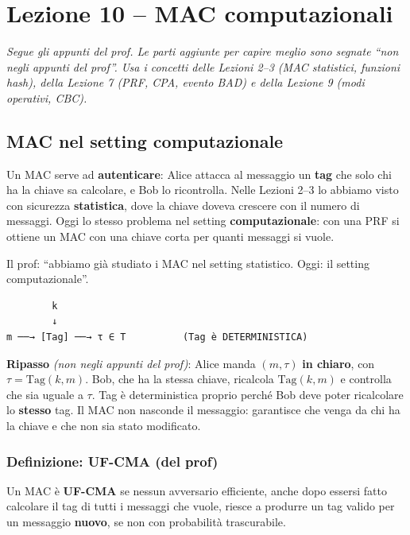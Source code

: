 \chapter{Lezione 10 -- MAC computazionali}

\emph{Segue gli appunti del prof. Le parti aggiunte per capire meglio sono segnate ``non negli appunti del prof''. Usa i concetti delle Lezioni 2--3 (MAC statistici, funzioni hash), della Lezione 7 (PRF, CPA, evento BAD) e della Lezione 9 (modi operativi, CBC).}

\section{MAC nel setting computazionale}

\begin{inbreve}
Un MAC serve ad \textbf{autenticare}: Alice attacca al messaggio un \textbf{tag} che solo chi ha la chiave sa calcolare, e Bob lo ricontrolla. Nelle Lezioni 2--3 lo abbiamo visto con sicurezza \textbf{statistica}, dove la chiave doveva crescere con il numero di messaggi. Oggi lo stesso problema nel setting \textbf{computazionale}: con una PRF si ottiene un MAC con una chiave corta per quanti messaggi si vuole.
\end{inbreve}

Il prof: ``abbiamo già studiato i MAC nel setting statistico. Oggi: il setting computazionale''.

\begin{verbatim}
        k
        ↓
m ──→ [Tag] ──→ τ ∈ T          (Tag è DETERMINISTICA)
\end{verbatim}

\begin{nota}
\textbf{Ripasso} \emph{(non negli appunti del prof)}: Alice manda \((m, \tau)\) \textbf{in chiaro}, con \(\tau = \text{Tag}(k, m)\). Bob, che ha la stessa chiave, ricalcola \(\text{Tag}(k, m)\) e controlla che sia uguale a \(\tau\). Tag è deterministica proprio perché Bob deve poter ricalcolare lo \textbf{stesso} tag. Il MAC non nasconde il messaggio: garantisce che venga da chi ha la chiave e che non sia stato modificato.
\end{nota}

\subsection{Definizione: UF-CMA (del prof)}

\begin{inbreve}
Un MAC è \textbf{UF-CMA} se nessun avversario efficiente, anche dopo essersi fatto calcolare il tag di tutti i messaggi che vuole, riesce a produrre un tag valido per un messaggio \textbf{nuovo}, se non con probabilità trascurabile.
\end{inbreve}

